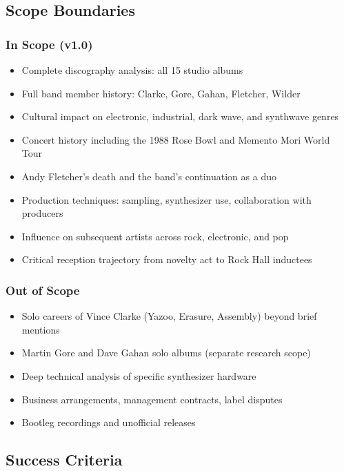 \documentclass[11pt,letterpaper]{article}
\begin{document}
\subsection{Scope Boundaries}

\subsubsection{In Scope (v1.0)}
\begin{itemize}
  \item Complete discography analysis: all 15 studio albums
  \item Full band member history: Clarke, Gore, Gahan, Fletcher, Wilder
  \item Cultural impact on electronic, industrial, dark wave, and synthwave genres
  \item Concert history including the 1988 Rose Bowl and Memento Mori World Tour
  \item Andy Fletcher's death and the band's continuation as a duo
  \item Production techniques: sampling, synthesizer use, collaboration with producers
  \item Influence on subsequent artists across rock, electronic, and pop
  \item Critical reception trajectory from novelty act to Rock Hall inductees
\end{itemize}

\subsubsection{Out of Scope}
\begin{itemize}
  \item Solo careers of Vince Clarke (Yazoo, Erasure, Assembly) beyond brief mentions
  \item Martin Gore and Dave Gahan solo albums (separate research scope)
  \item Deep technical analysis of specific synthesizer hardware
  \item Business arrangements, management contracts, label disputes
  \item Bootleg recordings and unofficial releases
\end{itemize}

\subsection{Success Criteria}
\end{document}
